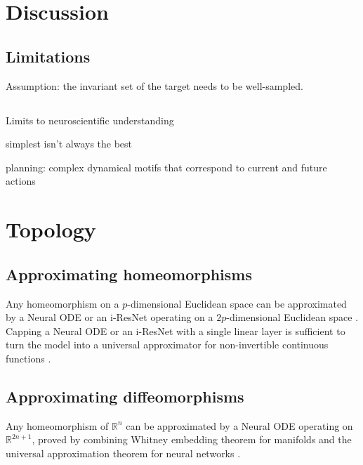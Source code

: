 \documentclass{article}
\theoremstyle{definition} \newtheorem{definition}{Definition}  \newtheorem{example}{Example}
\theoremstyle{remark} \newtheorem{remark}{Remark}
\newcounter{ct}
\begin{document}
\section{Discussion}

\subsection{Limitations}
Assumption: the invariant set of the target needs to be well-sampled.


\subsection{}
Limits to neuroscientific understanding \citep{chirimuuta2024brain}


simplest isn't always the best \citep{dyer2023simplest}


planning: complex dynamical motifs that correspond to current and future actions \citep{vyas2020ctd}


\newpage




\newpage
\appendix


\section{Topology}\label{sec:topology}

\subsection{Approximating homeomorphisms}\label{sec:homeomorphisms}
Any homeomorphism on a $p$-dimensional Euclidean space can be approximated by a Neural ODE or an i-ResNet operating on a $2p$-dimensional Euclidean space \citep{zhang2020approximation}.
%
Capping a Neural ODE or an i-ResNet with a single linear layer is sufficient to turn the model into a universal approximator for non-invertible continuous functions \citep{zhang2020approximation}.


\subsection{Approximating diffeomorphisms}\label{sec:diffeomorphisms}
Any homeomorphism of $\mathbb {R} ^{n}$ can be approximated by a Neural ODE operating on $\mathbb {R} ^{2n+1}$, proved by combining Whitney embedding theorem for manifolds and the universal approximation theorem for neural networks  \citep{zhang2020approximation}.
\end{document}
